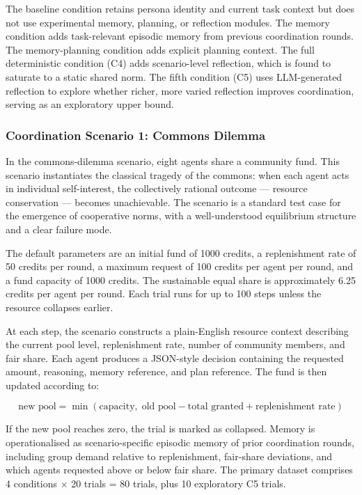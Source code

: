 \documentclass[11pt]{article}
\begin{document}
The baseline condition retains persona identity and current task context but does not use experimental memory, planning, or reflection modules. The memory condition adds task-relevant episodic memory from previous coordination rounds. The memory-planning condition adds explicit planning context. The full deterministic condition (C4) adds scenario-level reflection, which is found to saturate to a static shared norm. The fifth condition (C5) uses LLM-generated reflection to explore whether richer, more varied reflection improves coordination, serving as an exploratory upper bound.

\subsubsection{Coordination Scenario 1: Commons Dilemma}
In the commons-dilemma scenario, eight agents share a community fund. This scenario instantiates the classical tragedy of the commons: when each agent acts in individual self-interest, the collectively rational outcome --- resource conservation --- becomes unachievable. The scenario is a standard test case for the emergence of cooperative norms, with a well-understood equilibrium structure and a clear failure mode.

The default parameters are an initial fund of 1000 credits, a replenishment rate of 50 credits per round, a maximum request of 100 credits per agent per round, and a fund capacity of 1000 credits. The sustainable equal share is approximately 6.25 credits per agent per round. Each trial runs for up to 100 steps unless the resource collapses earlier.

At each step, the scenario constructs a plain-English resource context describing the current pool level, replenishment rate, number of community members, and fair share. Each agent produces a JSON-style decision containing the requested amount, reasoning, memory reference, and plan reference. The fund is then updated according to:

\[
\text{new pool} = \min(\text{capacity},\; \text{old pool} - \text{total granted} + \text{replenishment rate})
\]

If the new pool reaches zero, the trial is marked as collapsed. Memory is operationalised as scenario-specific episodic memory of prior coordination rounds, including group demand relative to replenishment, fair-share deviations, and which agents requested above or below fair share. The primary dataset comprises 4 conditions $\times$ 20 trials = 80 trials, plus 10 exploratory C5 trials.
\end{document}
